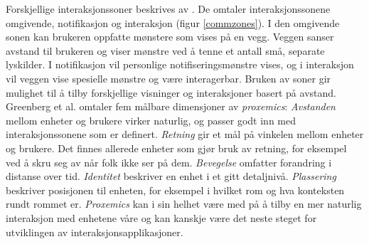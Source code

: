 {Forskjellige interaksjonssoner beskrives av \citet{streitz05}. De omtaler interaksjonssonene omgivende, notifikasjon og interaksjon (figur \ref{commzones}). I den omgivende sonen kan brukeren oppfatte mønstere som vises på en vegg. Veggen sanser avstand til brukeren og viser mønstre ved å tenne et antall små, separate lyskilder. I notifikasjon vil personlige notifiseringsmønstre vises, og i interaksjon vil veggen vise spesielle mønstre og være interagerbar. Bruken av soner gir mulighet til å tilby forskjellige visninger og interaksjoner basert på avstand. Greenberg et al. omtaler fem målbare dimensjoner av \emph{proxemics}: \emph{Avstanden} mellom enheter og brukere virker naturlig, og passer godt inn med interaksjonssonene som er definert. \emph{Retning} gir et mål på vinkelen mellom enheter og brukere. Det finnes allerede enheter som gjør bruk av retning, for eksempel ved å skru seg av når folk ikke ser på dem. \emph{Bevegelse} omfatter forandring i distanse over tid. \emph{Identitet} beskriver en enhet i et gitt detaljnivå. \emph{Plassering} beskriver posisjonen til enheten, for eksempel i hvilket rom og hva konteksten rundt rommet er. \emph{Proxemics} kan i sin helhet være med på å tilby en mer naturlig interaksjon med enhetene våre og kan kanskje være det neste steget for utviklingen av interaksjonsapplikasjoner.
}


